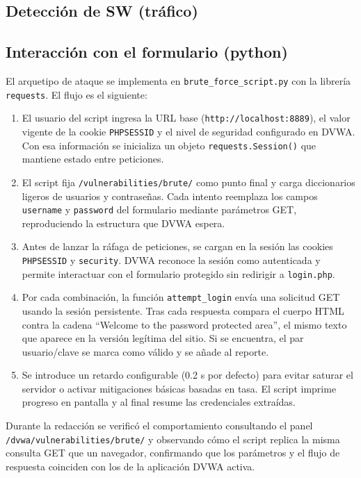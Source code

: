 \documentclass[letterpaper,12pt]{article}
\let\origsubsection\subsection
\renewcommand{\subsection}{\FloatBarrier\origsubsection}
\begin{document}
\subsection{Detección de SW (tráfico)}

\subsection{Interacción con el formulario (python)}

El arquetipo de ataque se implementa en \verb|brute_force_script.py| con la librería \verb|requests|. El flujo es el siguiente:
\begin{enumerate}
    \item El usuario del script ingresa la URL base (\verb|http://localhost:8889|), el valor vigente de la cookie \verb|PHPSESSID| y el nivel de seguridad configurado en DVWA. Con esa información se inicializa un objeto \verb|requests.Session()| que mantiene estado entre peticiones.
    \item El script fija \verb|/vulnerabilities/brute/| como punto final y carga diccionarios ligeros de usuarios y contraseñas. Cada intento reemplaza los campos \verb|username| y \verb|password| del formulario mediante parámetros GET, reproduciendo la estructura que DVWA espera.
    \item Antes de lanzar la ráfaga de peticiones, se cargan en la sesión las cookies \verb|PHPSESSID| y \verb|security|. DVWA reconoce la sesión como autenticada y permite interactuar con el formulario protegido sin redirigir a \verb|login.php|.
    \item Por cada combinación, la función \verb|attempt_login| envía una solicitud GET usando la sesión persistente. Tras cada respuesta compara el cuerpo HTML contra la cadena ``Welcome to the password protected area'', el mismo texto que aparece en la versión legítima del sitio. Si se encuentra, el par usuario/clave se marca como válido y se añade al reporte.
    \item Se introduce un retardo configurable (0.2 s por defecto) para evitar saturar el servidor o activar mitigaciones básicas basadas en tasa. El script imprime progreso en pantalla y al final resume las credenciales extraídas.
\end{enumerate}

Durante la redacción se verificó el comportamiento consultando el panel \verb|/dvwa/vulnerabilities/brute/| y observando cómo el script replica la misma consulta GET que un navegador, confirmando que los parámetros y el flujo de respuesta coinciden con los de la aplicación DVWA activa.
\end{document}
